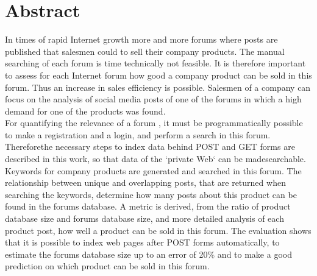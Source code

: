 \documentclass[%
a4paper,
DIV12, 
2.5headlines, 
bigheadings, 
titlepage, 
openbib,
]{scrartcl}
\begin{document}
\section*{Abstract}{
In times of rapid Internet growth more and more forums where posts are published that salesmen could to sell their company products. The manual searching of each forum is time technically not feasible. It is therefore important to assess for each Internet forum how good a company product can be sold in this forum. Thus an increase in sales efficiency is possible. Salesmen of a company can focus on the analysis of social media posts of one of the forums in which a high demand for one of the products was found.\\
For quantifying the relevance of a forum , it must be programmatically possible to make a registration and a login, and perform a search in this forum. \\
Thereforethe necessary steps to index data behind POST and GET forms are described in this work, so that data of the `private Web` can be made ​​searchable. Keywords for company products are generated and searched in this forum. The relationship between unique and overlapping posts, that are returned when searching the keywords, determine how many posts about this product can be found in the forums database. A metric is derived, from the ratio of product database size and forums database size, and more detailed analysis of each product post, how well a product can be sold in this forum. The evaluation shows that it is possible to index web pages after POST forms automatically, to estimate the forums database size up to an error of 20\% and to make a good prediction on which product can be sold in this forum.}
\end{document}
